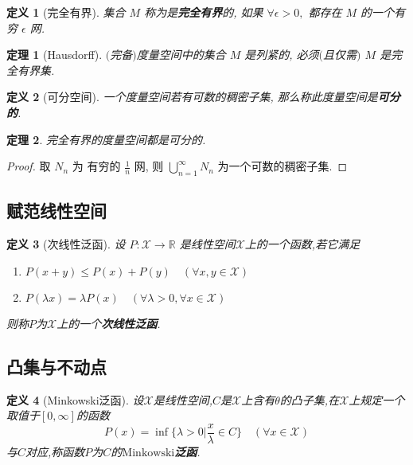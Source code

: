\documentclass[12pt,a4paper]{article}
\newtheorem{thm}{定理}[subsection]  %
\newtheorem{definition}{定义}[subsection] %
\begin{document}
\begin{definition}[完全有界]
    集合 $M$ 称为是\textbf{完全有界}的, 如果 $\forall \epsilon > 0,$ 都存在 $M$ 的一个有穷 $\epsilon$ 网.
\end{definition}

\begin{thm}[Hausdorff]
    $($完备$)$度量空间中的集合 $M$ 是列紧的, 必须$($且仅需$)$ $M$ 是完全有界集.
\end{thm}

\begin{definition}[可分空间]
    一个度量空间若有可数的稠密子集, 那么称此度量空间是\textbf{可分的}.
\end{definition}

\begin{thm}
    完全有界的度量空间都是可分的.
\end{thm}
\begin{proof}
    取 $N_n$ 为 有穷的 $\frac{1}{n}$ 网, 则 $\bigcup\limits_{n=1}^{\infty} N_n$ 为一个可数的稠密子集.
\end{proof}
\subsection{赋范线性空间}
\begin{definition}[次线性泛函]
    设 $P:\mathscr{X} \to \mathbb{R}$ 是线性空间$\mathscr{X}$上的一个函数,若它满足
    \begin{enumerate}[label=(\roman*),font=\upshape]
        \item $P(x+y) \leq P(x) + P(y) \quad (\forall x, y \in \mathscr{X})$
        \item $P(\lambda x) = \lambda P(x) \quad (\forall \lambda > 0, \forall x \in \mathscr{X})$
    \end{enumerate}
    则称$P$为$\mathscr{X}$上的一个\textbf{次线性泛函}.
\end{definition}

\subsection{凸集与不动点}
\begin{definition}[Minkowski泛函]
    设$\mathscr{X}$是线性空间,$C$是$\mathscr{X}$上含有$\theta$的凸子集,在$\mathscr{X}$上规定一个取值于$[0,\infty]$的函数
    \[P(x) = \inf\{\lambda > 0 |\frac{x}{\lambda} \in C\} \quad (\forall x \in \mathscr{X})\]
    与$C$对应,称函数$P$为$C$的\textbf{$\mathrm{Minkowski}$泛函}.
\end{definition}
\end{document}
